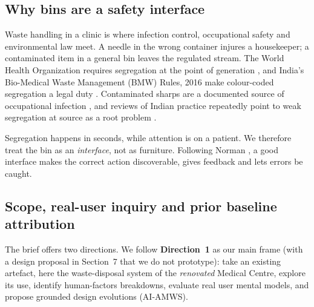 \documentclass[10pt,twocolumn,a4paper]{article}
\begin{document}
\subsection{Why bins are a safety interface}
Waste handling in a clinic is where infection control, occupational safety and environmental law meet. A needle in the wrong container injures a housekeeper; a contaminated item in a general bin leaves the regulated stream. The World Health Organization requires segregation at the point of generation \cite{who2014}, and India's Bio-Medical Waste Management (BMW) Rules, 2016 make colour-coded segregation a legal duty \cite{bmw2016}. Contaminated sharps are a documented source of occupational infection \cite{prusstun2005}, and reviews of Indian practice repeatedly point to weak segregation at source as a root problem \cite{datta2018,capoor2017}.

Segregation happens in seconds, while attention is on a patient. We therefore treat the bin as an \emph{interface}, not as furniture. Following Norman \cite{norman2013}, a good interface makes the correct action discoverable, gives feedback and lets errors be caught.

\subsection{Scope, real-user inquiry and prior baseline attribution}
The brief offers two directions. We follow \textbf{Direction~1} as our main frame (with a design proposal in Section~7 that we do not prototype): take an existing artefact, here the waste-disposal system of the \emph{renovated} Medical Centre, explore its use, identify human-factors breakdowns, evaluate real user mental models, and propose grounded design evolutions (AI-AMWS). 
\end{document}
